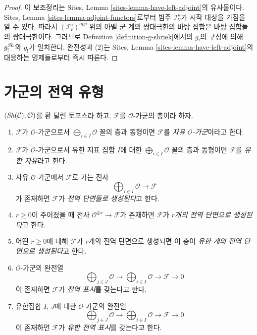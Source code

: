 \begin{proof}
이 보조정리는 Sites, Lemma \ref{sites-lemma-have-left-adjoint}의
유사물이다. Sites, Lemma \ref{sites-lemma-adjoint-functors}로부터 범주
$\mathcal{I}_V^u$가 시작 대상을 가짐을 알 수 있다. 따라서
$(\mathcal{I}_V^u)^{opp}$ 위의 아벨 군 계의 쌍대극한의 바탕 집합은
바탕 집합들의 쌍대극한이다. 그러므로 Definition
\ref{definition-g-shriek}에서의 $g_!$의 구성에 의해 $g_!^{\mathop{\mathit{Sh}}\nolimits}$와
$g_!$가 일치한다. 완전성과 (2)는 Sites, Lemma
\ref{sites-lemma-have-left-adjoint}의 대응하는 명제들로부터 즉시 따른다.
\end{proof}





\section{가군의 전역 유형}
\label{section-global}

\begin{definition}
\label{definition-global}
$(\mathop{\mathit{Sh}}\nolimits(\mathcal{C}), \mathcal{O})$를 환 달린 토포스라 하고,
$\mathcal{F}$를 $\mathcal{O}$-가군의 층이라 하자.
\begin{enumerate}
\item $\mathcal{F}$가 $\mathcal{O}$-가군으로서
$\bigoplus_{i \in I} \mathcal{O}$ 꼴의 층과 동형이면 $\mathcal{F}$를
{\it 자유 $\mathcal{O}$-가군}이라고 한다.
\item $\mathcal{F}$가 $\mathcal{O}$-가군으로서 유한 지표 집합 $I$에 대한
$\bigoplus_{i \in I} \mathcal{O}$ 꼴의 층과 동형이면 $\mathcal{F}$를
{\it 유한 자유}라고 한다.
\item 자유 $\mathcal{O}$-가군에서 $\mathcal{F}$로 가는 전사
$$
\bigoplus\nolimits_{i \in I} \mathcal{O} \longrightarrow \mathcal{F}
$$
가 존재하면 $\mathcal{F}$가 {\it 전역 단면들로 생성된다}고 한다.
\item $r \geq 0$이 주어졌을 때 전사
$\mathcal{O}^{\oplus r} \to \mathcal{F}$가 존재하면 $\mathcal{F}$가
{\it $r$개의 전역 단면으로 생성된다}고 한다.
\item 어떤 $r \geq 0$에 대해 $\mathcal{F}$가 $r$개의 전역 단면으로
생성되면 이 층이 {\it 유한 개의 전역 단면으로 생성된다}고 한다.
\item $\mathcal{O}$-가군의 완전열
$$
\bigoplus\nolimits_{j \in J} \mathcal{O} \longrightarrow
\bigoplus\nolimits_{i \in I} \mathcal{O} \longrightarrow
\mathcal{F} \longrightarrow 0
$$
이 존재하면 $\mathcal{F}$가 {\it 전역 표시}를 갖는다고 한다.
\item 유한집합 $I$, $J$에 대한 $\mathcal{O}$-가군의 완전열
$$
\bigoplus\nolimits_{j \in J} \mathcal{O} \longrightarrow
\bigoplus\nolimits_{i \in I} \mathcal{O} \longrightarrow
\mathcal{F} \longrightarrow 0
$$
이 존재하면 $\mathcal{F}$가 {\it 유한 전역 표시}를 갖는다고 한다.
\end{enumerate}
\end{definition}

